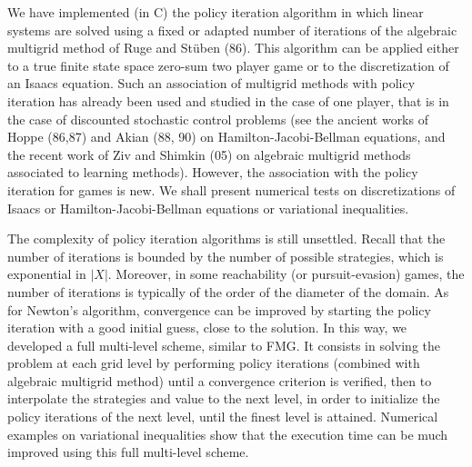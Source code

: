 \documentclass{report}
\begin{document}
We have implemented (in C) the policy iteration algorithm in which linear
systems are solved using a fixed or adapted number of iterations of the
algebraic multigrid method of Ruge and St\"uben (86).
This algorithm can be applied either to a true finite state space
zero-sum two player game or to the discretization of an Isaacs equation.
Such an association of multigrid methods with policy iteration has
already been used and studied in the case of one player, that is in the case
of discounted stochastic control problems (see the ancient works
of Hoppe (86,87) and Akian (88, 90) on Hamilton-Jacobi-Bellman equations,
and the recent work of Ziv and Shimkin (05)
on algebraic multigrid methods associated to learning methods).
However, the association with the policy iteration for games is new.
We shall present numerical tests
on discretizations of Isaacs or Hamilton-Jacobi-Bellman equations
or variational inequalities.

The complexity of policy iteration algorithms is still unsettled.
Recall that the number of iterations is bounded by the
number of possible strategies, which is exponential in $|X|$.
Moreover, in some reachability (or pursuit-evasion) games,
the number of iterations is typically of the order of the diameter of the
domain.
As for Newton's algorithm,
convergence can be improved by starting the
policy iteration with a good initial guess, close to
the solution. In this
way, we developed a full multi-level scheme, similar to FMG.
It consists in solving the problem at each grid level
by performing policy iterations (combined with algebraic multigrid method)
until a convergence criterion is verified,
then to interpolate the strategies and
value to the next level, in order to initialize the policy iterations
of the next level, until the finest level is attained.
Numerical examples on variational inequalities show that the execution time
can be much improved using this full multi-level scheme.
\end{document}

